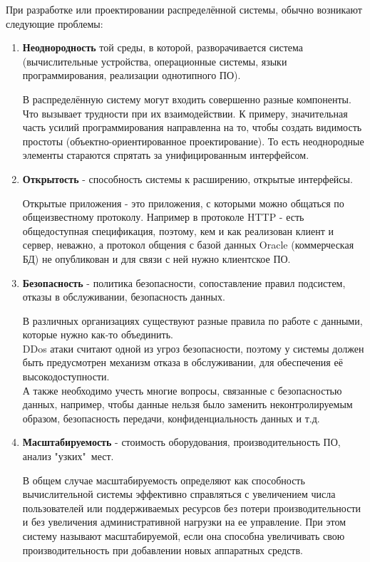 \noindent При разработке или проектировании распределённой системы, обычно возникают следующие проблемы:
\begin{enumerate}
\setlength\itemsep{0.32em}
\item
\textbf{ Неоднородность} той среды, в которой, разворачивается система (вычислительные устройства, операционные системы, языки программирования, реализации однотипного ПО). 

В распределённую систему могут входить совершенно разные компоненты. Что вызывает трудности при их взаимодействии.
К примеру, значительная часть усилий программирования направленна на то, чтобы создать видимость простоты (объектно-ориентированное проектирование).
То есть неоднородные элементы стараются спрятать за унифицированным интерфейсом.

\item
\textbf{ Открытость} - способность системы к расширению, открытые интерфейсы. 

Открытые приложения - это приложения, с которыми можно общаться по общеизвестному протоколу. Например в протоколе HTTP - есть общедоступная спецификация, поэтому, кем и как реализован клиент и сервер, неважно, а протокол общения с базой данных Oracle (коммерческая БД) не опубликован и для связи с ней нужно клиентское ПО.

\item
\textbf{ Безопасность} - политика безопасности, сопоставление правил подсистем, отказы в обслуживании, безопасность данных.

В различных организациях существуют разные правила по работе с данными, которые нужно как-то объединить. \\
DDos атаки считают одной из угроз безопасности, поэтому у системы должен быть предусмотрен механизм отказа в обслуживании, для обеспечения её высокодоступности.\\
А также необходимо учесть многие вопросы, связанные с безопасностью данных, например, чтобы данные нельзя было заменить неконтролируемым образом, безопасность передачи, конфиденциальность данных и т.д.

\item
\textbf{ Масштабируемость} - стоимость оборудования, производительность ПО, анализ "узких"\ мест.

В общем случае масштабируемость определяют как способность вычислительной системы эффективно справляться с увеличением числа пользователей или поддерживаемых ресурсов без потери производительности и без увеличения административной нагрузки на ее управление. При этом систему называют масштабируемой, если она способна увеличивать свою производительность при добавлении новых аппаратных средств.  


\end{enumerate}
